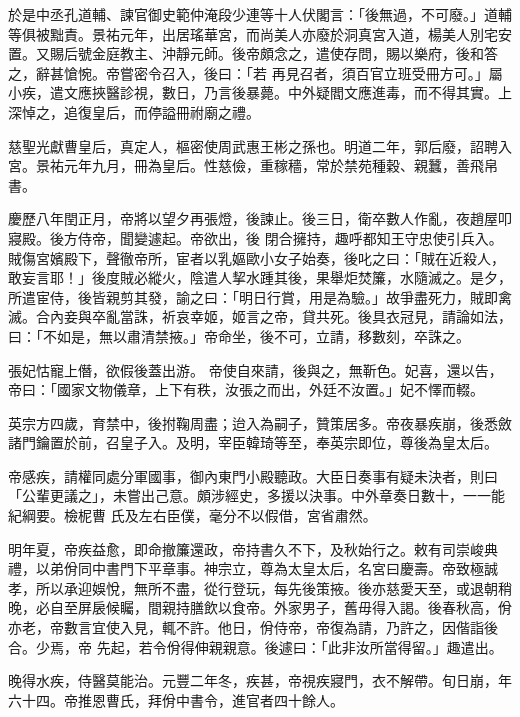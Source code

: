 \begin{pinyinscope}
 於是中丞孔道輔、諫官御史範仲淹段少連等十人伏閣言：「後無過，不可廢。」道輔等俱被黜責。景祐元年，出居瑤華宮，而尚美人亦廢於洞真宮入道，楊美人別宅安置。又賜后號金庭教主、沖靜元師。後帝頗念之，遣使存問，賜以樂府，後和答之，辭甚愴惋。帝嘗密令召入，後曰：「若
 再見召者，須百官立班受冊方可。」屬小疾，遣文應挾醫診視，數日，乃言後暴薨。中外疑閻文應進毒，而不得其實。上深悼之，追復皇后，而停謚冊祔廟之禮。



 慈聖光獻曹皇后，真定人，樞密使周武惠王彬之孫也。明道二年，郭后廢，詔聘入宮。景祐元年九月，冊為皇后。性慈儉，重稼穡，常於禁苑種穀、親蠶，善飛帛書。



 慶歷八年閏正月，帝將以望夕再張燈，後諫止。後三日，衛卒數人作亂，夜趙屋叩寢殿。後方侍帝，聞變遽起。帝欲出，後
 閉合擁持，趣呼都知王守忠使引兵入。賊傷宮嬪殿下，聲徹帝所，宦者以乳嫗歐小女子始奏，後叱之曰：「賊在近殺人，敢妄言耶！」後度賊必縱火，陰遣人挈水踵其後，果舉炬焚簾，水隨滅之。是夕，所遣宦侍，後皆親剪其發，諭之曰：「明日行賞，用是為驗。」故爭盡死力，賊即禽滅。合內妾與卒亂當誅，祈哀幸姬，姬言之帝，貸共死。後具衣冠見，請論如法，曰：「不如是，無以肅清禁掖。」帝命坐，後不可，立請，移數刻，卒誅之。



 張妃怙寵上僭，欲假後蓋出游。
 帝使自來請，後與之，無靳色。妃喜，還以告，帝曰：「國家文物儀章，上下有秩，汝張之而出，外廷不汝置。」妃不懌而輟。



 英宗方四歲，育禁中，後拊鞠周盡；迨入為嗣子，贊策居多。帝夜暴疾崩，後悉斂諸門鑰置於前，召皇子入。及明，宰臣韓琦等至，奉英宗即位，尊後為皇太后。



 帝感疾，請權同處分軍國事，御內東門小殿聽政。大臣日奏事有疑未決者，則曰「公輩更議之」，未嘗出己意。頗涉經史，多援以決事。中外章奏日數十，一一能紀綱要。檢柅曹
 氏及左右臣僕，毫分不以假借，宮省肅然。



 明年夏，帝疾益愈，即命撤簾還政，帝持書久不下，及秋始行之。敕有司崇峻典禮，以弟佾同中書門下平章事。神宗立，尊為太皇太后，名宮曰慶壽。帝致極誠孝，所以承迎娛悅，無所不盡，從行登玩，每先後策掖。後亦慈愛天至，或退朝稍晚，必自至屏扆候矚，間親持膳飲以食帝。外家男子，舊毋得入謁。後春秋高，佾亦老，帝數言宜使入見，輒不許。他日，佾侍帝，帝復為請，乃許之，因偕詣後合。少焉，帝
 先起，若令佾得伸親親意。後遽曰：「此非汝所當得留。」趣遣出。



 晚得水疾，侍醫莫能治。元豐二年冬，疾甚，帝視疾寢門，衣不解帶。旬日崩，年六十四。帝推恩曹氏，拜佾中書令，進官者四十餘人。




\end{pinyinscope}
